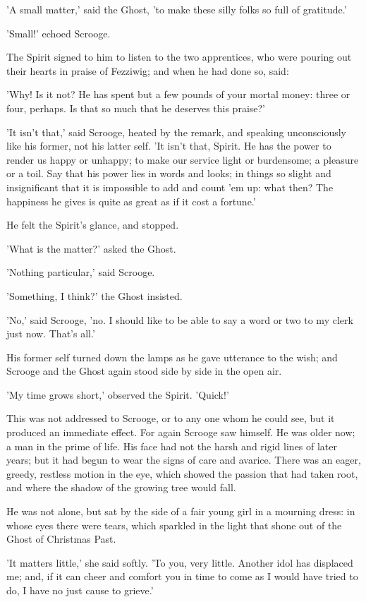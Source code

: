 'A small matter,' said the Ghost, 'to make these silly folks so full of
gratitude.'

'Small!' echoed Scrooge.

The Spirit signed to him to listen to the two apprentices, who were
pouring out their hearts in praise of Fezziwig; and when he had done so,
said:

'Why! Is it not? He has spent but a few pounds of your mortal money:
three or four, perhaps. Is that so much that he deserves this praise?'

'It isn't that,' said Scrooge, heated by the remark, and speaking
unconsciously like his former, not his latter self. 'It isn't that,
Spirit. He has the power to render us happy or unhappy; to make our
service light or burdensome; a pleasure or a toil. Say that his power
lies in words and looks; in things so slight and insignificant that it
is impossible to add and count 'em up: what then? The happiness he gives
is quite as great as if it cost a fortune.'

He felt the Spirit's glance, and stopped.

'What is the matter?' asked the Ghost.

'Nothing particular,' said Scrooge.

'Something, I think?' the Ghost insisted.

'No,' said Scrooge, 'no. I should like to be able to say a word or two
to my clerk just now. That's all.'

His former self turned down the lamps as he gave utterance to the wish;
and Scrooge and the Ghost again stood side by side in the open air.

'My time grows short,' observed the Spirit. 'Quick!'

This was not addressed to Scrooge, or to any one whom he could see, but
it produced an immediate effect. For again Scrooge saw himself. He was
older now; a man in the prime of life. His face had not the harsh and
rigid lines of later years; but it had begun to wear the signs of care
and avarice. There was an eager, greedy, restless motion in the eye,
which showed the passion that had taken root, and where the shadow of
the growing tree would fall.

He was not alone, but sat by the side of a fair young girl in a mourning
dress: in whose eyes there were tears, which sparkled in the light that
shone out of the Ghost of Christmas Past.

'It matters little,' she said softly. 'To you, very little. Another idol
has displaced me; and, if it can cheer and comfort you in time to come
as I would have tried to do, I have no just cause to grieve.'

